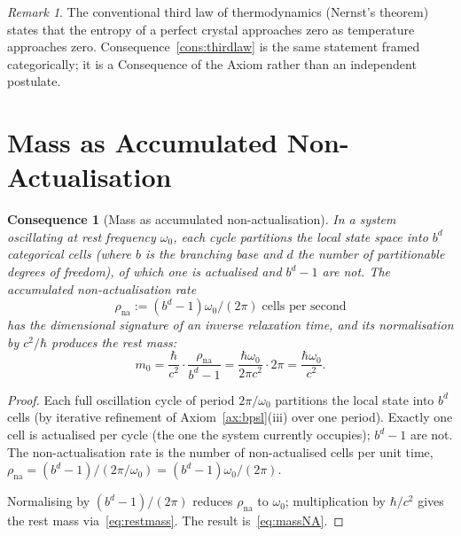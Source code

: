 \documentclass[11pt,twocolumn,a4paper]{article}
\theoremstyle{axiomstyle}
\theoremstyle{conseqstyle}
\newtheorem{consequence}{Consequence}
\theoremstyle{definition}
\theoremstyle{remark}
\newtheorem*{remark}{Remark}
\begin{document}
\begin{remark}
The conventional third law of thermodynamics (Nernst's theorem) states that the entropy of a perfect crystal approaches zero as temperature approaches zero. Consequence~\ref{cons:thirdlaw} is the same statement framed categorically; it is a Consequence of the Axiom rather than an independent postulate.
\end{remark}

\section{Mass as Accumulated Non-Actualisation}
\label{sec:massmemory}

\begin{consequence}[Mass as accumulated non-actualisation]
\label{cons:massmemory}
In a system oscillating at rest frequency $\omega_{0}$, each cycle partitions the local state space into $b^{d}$ categorical cells (where $b$ is the branching base and $d$ the number of partitionable degrees of freedom), of which one is actualised and $b^{d}-1$ are not. The accumulated non-actualisation rate
\begin{equation}
\rho_{\text{na}}:=(b^{d}-1)\omega_{0}/(2\pi)\;\text{cells per second}
\label{eq:rateNA}
\end{equation}
has the dimensional signature of an inverse relaxation time, and its normalisation by $c^{2}/\hbar$ produces the rest mass:
\begin{equation}
m_{0}=\frac{\hbar}{c^{2}}\cdot\frac{\rho_{\text{na}}}{b^{d}-1}=\frac{\hbar\omega_{0}}{2\pi c^{2}}\cdot 2\pi=\frac{\hbar\omega_{0}}{c^{2}}.
\label{eq:massNA}
\end{equation}
\end{consequence}

\begin{proof}
Each full oscillation cycle of period $2\pi/\omega_{0}$ partitions the local state into $b^{d}$ cells (by iterative refinement of Axiom~\ref{ax:bpsl}(iii) over one period). Exactly one cell is actualised per cycle (the one the system currently occupies); $b^{d}-1$ are not. The non-actualisation rate is the number of non-actualised cells per unit time, $\rho_{\text{na}}=(b^{d}-1)/(2\pi/\omega_{0})=(b^{d}-1)\omega_{0}/(2\pi)$.

Normalising by $(b^{d}-1)/(2\pi)$ reduces $\rho_{\text{na}}$ to $\omega_{0}$; multiplication by $\hbar/c^{2}$ gives the rest mass via~\eqref{eq:restmass}. The result is~\eqref{eq:massNA}.
\end{proof}
\end{document}
